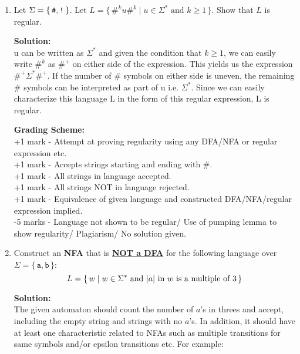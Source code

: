 \documentclass[11pt, article, oneside]{memoir}
\newcommand{\set}[1]{\{\, #1\, \}}
\DeclarePairedDelimiter\abs{\lvert}{\rvert}
\begin{document}
\begin{enumerate}
    \item 
        Let \(\Sigma = \set{\text{\texttt{\#}}, \text{\texttt{!}}}\).
        Let \(L = \set{{\texttt{\#}^k}u{\texttt{\#}^k} \mid u \in \Sigma^* \text{ and } k \ge 1}\). Show that \(L\) is regular.
        
        \textbf{Solution:}
        \\u can be written as \(\Sigma^*\) and given the condition that \(k \ge 1\), we can easily write \({\texttt{\#}^k}\) as \({\texttt{\#}^+}\) on either side of the expression. This yields us the expression \({\texttt{\#}^+}\Sigma^*{\texttt{\#}^+}\). If the number of \(\texttt{\#}\) symbols on either side is uneven, the remaining \(\texttt{\#}\) symbols can be interpreted as part of u i.e. \(\Sigma^*\). Since we can easily characterize this language L in the form of this regular expression, L is regular.

        \textbf{Grading Scheme:}
        \\+1 mark - Attempt at proving regularity using any DFA/NFA or regular expression etc.
        \\+1 mark - Accepts strings starting and ending with \(\texttt{\#}\).
        \\+1 mark - All strings in language accepted.
        \\+1 mark - All strings NOT in language rejected.
        \\+1 mark - Equivalence of given language and constructed DFA/NFA/regular expression implied.
        \\-5 marks -  Language not shown to be regular/ Use of pumping lemma to show regularity/ Plagiarism/ No solution given.
        
    \item
        Construct an \textbf{NFA} that is \textbf{\underline{NOT a DFA}} for the following language over \(\Sigma = \set{\texttt{a}, \texttt{b}}\):
        \[
            L = \set{w \mid w \in \Sigma^* \text{ and }
            \text{\(\abs{a}\) in \(w\) is a multiple of \(3\)}}
        \]
        
        \textbf{Solution:}
        \\The given automaton should count the number of \(a\)'s in threes and accept, including the empty string and strings with no \(a\)'s. In addition, it should have at least one characteristic related to NFAs such as multiple transitions for same symbols and/or epsilon transitions etc. For example:
        \begin{center}
\end{center}
\end{enumerate}
\end{document}
